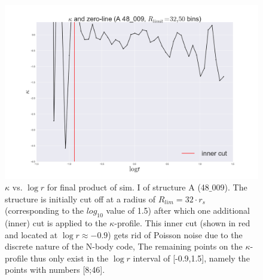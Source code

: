 \begin{figure}[!htbp]
\centering
\includegraphics[width=1.0\linewidth]{img/A_48_009_kappa_logr_I_R32_cuts.png}
\caption{$\kappa$ vs. $\log r$ for final product of sim. I of structure A (48$\_$009).
The structure is initially cut off at a radius of $R_{lim} = 32\cdot r_s$ (corresponding to the $log_{10}$ value of 1.5) 
after which one additional (inner) cut is applied to the $\kappa$-profile.
This inner cut (shown in red and located at $\log r \approx -0.9$) gets rid of Poisson noise due to the discrete nature of the N-body code, 
The remaining points on the $\kappa$-profile thus only exist in the $\log r $ interval of [-0.9,1.5], namely the points with numbers [8;46].}
\label{fig:test}
\end{figure}

